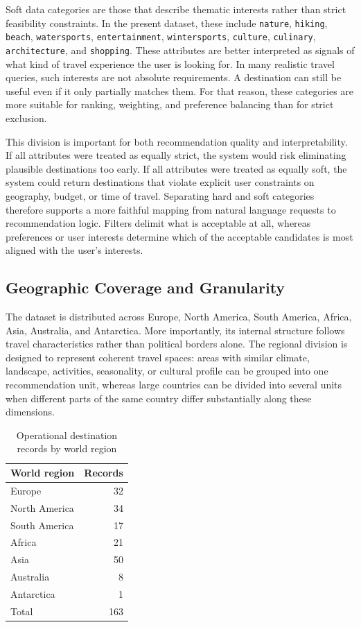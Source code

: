 Soft data categories are those that describe thematic interests rather than strict feasibility constraints. In the present dataset, these include \texttt{nature}, \texttt{hiking}, \texttt{beach}, \texttt{watersports}, \texttt{entertainment}, \texttt{wintersports}, \texttt{culture}, \texttt{culinary}, \texttt{architecture}, and \texttt{shopping}. These attributes are better interpreted as signals of what kind of travel experience the user is looking for. In many realistic travel queries, such interests are not absolute requirements. A destination can still be useful even if it only partially matches them. For that reason, these categories are more suitable for ranking, weighting, and preference balancing than for strict exclusion.

This division is important for both recommendation quality and interpretability. If all attributes were treated as equally strict, the system would risk eliminating plausible destinations too early. If all attributes were treated as equally soft, the system could return destinations that violate explicit user constraints on geography, budget, or time of travel. Separating hard and soft categories therefore supports a more faithful mapping from natural language requests to recommendation logic. Filters delimit what is acceptable at all, whereas preferences or user interests determine which of the acceptable candidates is most aligned with the user's interests.

\subsection{Geographic Coverage and Granularity}\label{subsection:recommendation-generation:data-grounding:coverage}

The dataset is distributed across Europe, North America, South America, Africa, Asia, Australia, and Antarctica. More importantly, its internal structure follows travel characteristics rather than political borders alone. The regional division is designed to represent coherent travel spaces: areas with similar climate, landscape, activities, seasonality, or cultural profile can be grouped into one recommendation unit, whereas large countries can be divided into several units when different parts of the same country differ substantially along these dimensions.

\begin{table}[htbp]
\centering
\begin{tabular}{lr}
\hline
World region & Records \\
\hline
Europe & 32 \\
North America & 34 \\
South America & 17 \\
Africa & 21 \\
Asia & 50 \\
Australia & 8 \\
Antarctica & 1 \\
\hline
Total & 163 \\
\hline
\end{tabular}
\caption{Operational destination records by world region}
\label{table:recommendation-generation:destination-distribution}
\end{table}

